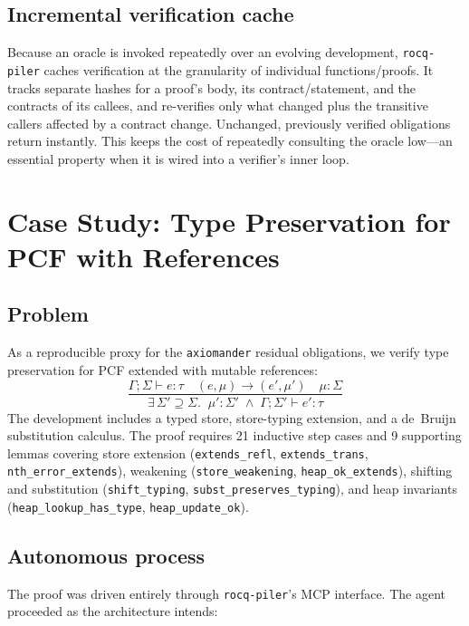 \documentclass[11pt,a4paper]{article}
\newcommand{\tool}{\texttt{rocq-piler}\xspace}
\newcommand{\axm}{\texttt{axiomander}\xspace}
\begin{document}
\subsection{Incremental verification cache}

Because an oracle is invoked repeatedly over an evolving development, \tool
caches verification at the granularity of individual functions/proofs. It tracks
separate hashes for a proof's body, its contract/statement, and the contracts of
its callees, and re-verifies only what changed plus the transitive callers
affected by a contract change. Unchanged, previously verified obligations return
instantly. This keeps the cost of repeatedly consulting the oracle low---an
essential property when it is wired into a verifier's inner loop.

\section{Case Study: Type Preservation for PCF with References}
\label{sec:casestudy}

\subsection{Problem}

As a reproducible proxy for the \axm residual obligations, we verify type
preservation for PCF extended with mutable references:
\[
\frac{\Gamma; \Sigma \vdash e : \tau \quad (e,\mu) \rightarrow (e',\mu')
      \quad \mu : \Sigma}
     {\exists\,\Sigma' \supseteq \Sigma.\;\; \mu' : \Sigma'
      \;\wedge\; \Gamma; \Sigma' \vdash e' : \tau}
\]
The development includes a typed store, store-typing extension, and a de~Bruijn
substitution calculus. The proof requires 21 inductive step cases and 9
supporting lemmas covering store extension (\texttt{extends\_refl},
\texttt{extends\_trans}, \texttt{nth\_error\_extends}), weakening
(\texttt{store\_weakening}, \texttt{heap\_ok\_extends}), shifting and
substitution (\texttt{shift\_typing}, \texttt{subst\_preserves\_typing}), and
heap invariants (\texttt{heap\_lookup\_has\_type}, \texttt{heap\_update\_ok}).

\subsection{Autonomous process}

The proof was driven entirely through \tool's MCP interface. The agent
proceeded as the architecture intends:
\end{document}
